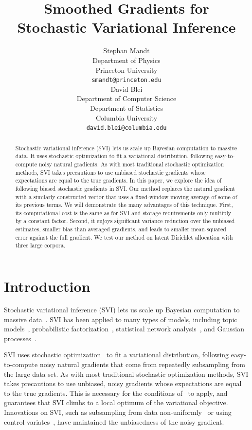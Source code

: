 \documentclass{article} %
\title{Smoothed Gradients for \\Stochastic Variational Inference}
\author{
Stephan Mandt \\
Department of Physics\\
Princeton University\\
\texttt{smandt@princeton.edu} \\
\And
David Blei \\
Department of Computer Science \\
Department of Statistics \\
Columbia University \\
\texttt{david.blei@columbia.edu} \\
}
\begin{document}
\maketitle

\begin{abstract}
Stochastic variational inference (SVI) lets us scale up Bayesian
computation to massive data.  It uses stochastic optimization to fit a
variational distribution, following easy-to-compute noisy natural gradients.
As with most traditional stochastic optimization methods, SVI
takes precautions to use unbiased stochastic gradients whose expectations
are equal to the true gradients.  In this paper, we explore the idea
of following biased stochastic gradients in SVI.  Our method
replaces the natural gradient with a similarly constructed vector that
uses a fixed-window moving average of some of its previous terms.  We
will demonstrate the many advantages of this technique. First, its
computational cost is the same as for SVI and storage requirements
only multiply by a constant factor. Second, it enjoys significant
variance reduction over the unbiased estimates, smaller bias than
averaged gradients, and leads to smaller mean-squared error against
the full gradient.  We test our method on latent Dirichlet
allocation with three large corpora.

\end{abstract}
\section{Introduction}

Stochastic variational inference (SVI) lets us scale up Bayesian
computation to massive data~\cite{hoffman}. SVI has been applied
to many types of models, including topic models~\cite{hoffman},
probabilistic factorization~\cite{gopolan_rec}, statistical network
analysis~\cite{gopalan_network, xing}, and Gaussian
processes~\cite{lawrence}.

SVI uses stochastic optimization~\cite{robbins} to fit a variational
distribution, following easy-to-compute noisy natural gradients that
come from repeatedly subsampling from the large data set.  As with
most traditional stochastic optimization methods, SVI takes
precautions to use unbiased, noisy gradients whose
expectations are equal to the true gradients.  This is necessary for
the conditions of~\cite{robbins} to apply, and guarantees
that SVI climbs to a local optimum of the variational objective.
Innovations on SVI, such as subsampling from data
non-uniformly~\cite{gopolan_rec} or using control
variates~\cite{wang2013,JohnsonZhang}, have maintained the unbiasedness of the noisy
gradient.
\end{document}
